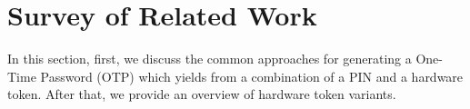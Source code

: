 

\section{Survey of Related Work}\label{Survey-of-Related-Work}





%
%
%


In this section, first, we discuss the common approaches for generating a One-Time Password (OTP) which yields from a combination of a PIN and a hardware token.  After that, we provide an overview of hardware token variants. 


